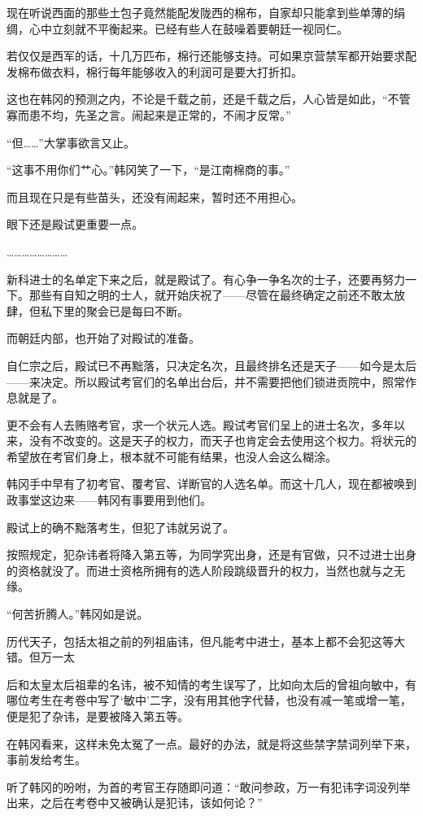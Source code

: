 现在听说西面的那些土包子竟然能配发陇西的棉布，自家却只能拿到些单薄的绢绸，心中立刻就不平衡起来。已经有些人在鼓噪着要朝廷一视同仁。

若仅仅是西军的话，十几万匹布，棉行还能够支持。可如果京营禁军都开始要求配发棉布做衣料，棉行每年能够收入的利润可是要大打折扣。

这也在韩冈的预测之内，不论是千载之前，还是千载之后，人心皆是如此，“不管寡而患不均，先圣之言。闹起来是正常的，不闹才反常。”

“但……”大掌事欲言又止。

“这事不用你们艹心。”韩冈笑了一下，“是江南棉商的事。”

而且现在只是有些苗头，还没有闹起来，暂时还不用担心。

眼下还是殿试更重要一点。

……………………

新科进士的名单定下来之后，就是殿试了。有心争一争名次的士子，还要再努力一下。那些有自知之明的士人，就开始庆祝了——尽管在最终确定之前还不敢太放肆，但私下里的聚会已是每曰不断。

而朝廷内部，也开始了对殿试的准备。

自仁宗之后，殿试已不再黜落，只决定名次，且最终排名还是天子——如今是太后——来决定。所以殿试考官们的名单出台后，并不需要把他们锁进贡院中，照常作息就是了。

更不会有人去贿赂考官，求一个状元人选。殿试考官们呈上的进士名次，多年以来，没有不改变的。这是天子的权力，而天子也肯定会去使用这个权力。将状元的希望放在考官们身上，根本就不可能有结果，也没人会这么糊涂。

韩冈手中早有了初考官、覆考官、详断官的人选名单。而这十几人，现在都被唤到政事堂这边来——韩冈有事要用到他们。

殿试上的确不黜落考生，但犯了讳就另说了。

按照规定，犯杂讳者将降入第五等，为同学究出身，还是有官做，只不过进士出身的资格就没了。而进士资格所拥有的选人阶段跳级晋升的权力，当然也就与之无缘。

“何苦折腾人。”韩冈如是说。

历代天子，包括太祖之前的列祖庙讳，但凡能考中进士，基本上都不会犯这等大错。但万一太

后和太皇太后祖辈的名讳，被不知情的考生误写了，比如向太后的曾祖向敏中，有哪位考生在考卷中写了‘敏中’二字，没有用其他字代替，也没有减一笔或增一笔，便是犯了杂讳，是要被降入第五等。

在韩冈看来，这样未免太冤了一点。最好的办法，就是将这些禁字禁词列举下来，事前发给考生。

听了韩冈的吩咐，为首的考官王存随即问道：“敢问参政，万一有犯讳字词没列举出来，之后在考卷中又被确认是犯讳，该如何论？”

